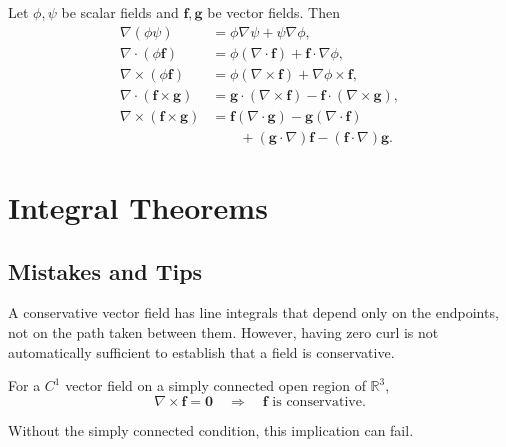 \begin{method}
Let \(\phi,\psi\) be scalar fields and \(\boldsymbol{f},\boldsymbol{g}\) be vector fields. Then
\begin{align*}
\nabla(\phi\psi)
&= \phi\nabla\psi+\psi\nabla\phi,\\[6pt]
\nabla\cdot(\phi\boldsymbol{f})
&= \phi(\nabla\cdot\boldsymbol{f})
+\boldsymbol{f}\cdot\nabla\phi,\\[6pt]
\nabla\times(\phi\boldsymbol{f})
&= \phi(\nabla\times\boldsymbol{f})
+\nabla\phi\times\boldsymbol{f},\\[6pt]
\nabla\cdot(\boldsymbol{f}\times\boldsymbol{g})
&= \boldsymbol{g}\cdot(\nabla\times\boldsymbol{f})
-\boldsymbol{f}\cdot(\nabla\times\boldsymbol{g}),\\[6pt]
\nabla\times(\boldsymbol{f}\times\boldsymbol{g})
&= \boldsymbol{f}(\nabla\cdot\boldsymbol{g})
-\boldsymbol{g}(\nabla\cdot\boldsymbol{f})\\
&\qquad +(\boldsymbol{g}\cdot\nabla)\boldsymbol{f}
-(\boldsymbol{f}\cdot\nabla)\boldsymbol{g}.
\end{align*}
\end{method}

\section{Integral Theorems}

\subsection{Mistakes and Tips}



\begin{mistake}
A conservative vector field has line integrals that depend only on the endpoints, not on the path taken between them. However, having zero curl is not automatically sufficient to establish that a field is conservative.

For a \(C^1\) vector field on a simply connected open region of \(\mathbb R^3\),
\[
\nabla\times\boldsymbol f=\boldsymbol 0
\quad\Longrightarrow\quad
\boldsymbol f\text{ is conservative}.
\]

Without the simply connected condition, this implication can fail.

\end{mistake}


